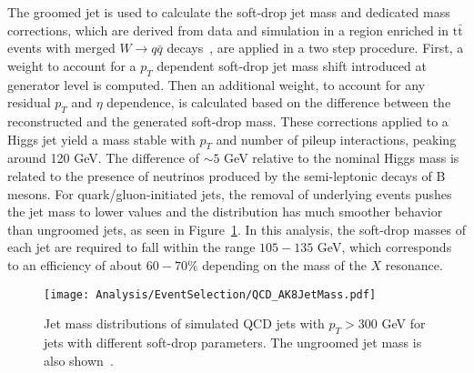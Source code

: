 The groomed jet is used to calculate the soft-drop jet mass and dedicated mass corrections, which are derived from data and simulation in a region enriched in $\mathrm{t\bar{t}}$ events with merged $W\rightarrow q\bar{q}$ decays~\cite{SDCorr}, are applied in a two step procedure. First, a weight to account for a $p_{T}$ dependent soft-drop jet mass shift introduced at generator level is computed. Then an additional weight, to account for any residual $p_{T}$ and $\eta$ dependence, is calculated based on the difference between the reconstructed and the generated soft-drop mass. These corrections applied to a Higgs jet yield a mass stable with $p_{T}$ and number of pileup interactions, peaking around 120 GeV. The difference of ${\sim}5$ GeV relative to the nominal Higgs mass is related to the presence of neutrinos produced by the semi-leptonic decays of B mesons. For quark/gluon-initiated jets, the removal of underlying events pushes the jet mass to lower values and the distribution has much smoother behavior than ungroomed jets, as seen in Figure~\ref{fig:QCDSDMass}. In this analysis, the soft-drop masses of each jet are required to fall within the range $105-135$ GeV, which corresponds to an efficiency of about $60-70\%$ depending on the mass of the $X$ resonance. 

\begin{figure}[h!]
\begin{center}
\texttt{[image: Analysis/EventSelection/QCD\_AK8JetMass.pdf]}
\end{center}
\caption{Jet mass distributions of simulated QCD jets with $p_{T}>300$ GeV for jets with different soft-drop parameters. The ungroomed jet mass is also shown~\cite{QCDJetMass}.}
\label{fig:QCDSDMass}
\end{figure}




